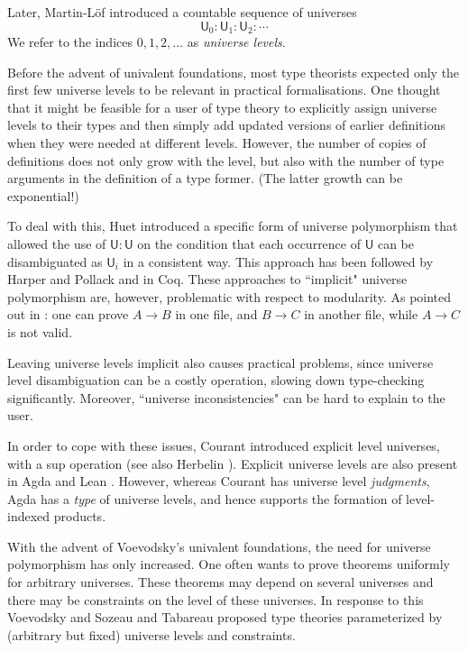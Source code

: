 \documentclass[11pt,a4paper]{article}
\theoremstyle{definition}
\newcommand{\UU}{\mathsf{U}}
\begin{document}
Later, Martin-L\"of \cite{martinlof:predicative} introduced a countable sequence of universes
$$
\UU_0 : \UU_1 : \UU_2 : \cdots
$$
We refer to the indices $0, 1, 2, \ldots$ as {\em universe levels}.

Before the advent of univalent foundations, most type theorists expected
only the first few universe levels to be relevant in practical formalisations.
One thought that it might be feasible for a user of
type theory to explicitly assign universe levels to their types and
then simply add updated versions of earlier
definitions when they were needed at different levels.
However, the number of copies of definitions does not only grow with the level,
but also with the number of type arguments in the definition of a type former.
(The latter growth can be exponential!)

To deal with this, Huet \cite{Huet87} introduced a specific form of
universe polymorphism that allowed the use of $\UU:\UU$
on the condition that each occurrence of $\UU$ can be disambiguated
as $\UU_i$ in a consistent way.
This approach has been followed by Harper and Pollack \cite{HarperP91} and
in Coq.
These  approaches to ``implicit" universe polymorphism are, however,
problematic with respect to modularity. As pointed out in \cite{Courant02,Simpson04}:
one can prove $A\rightarrow B$ in one file, and $B\rightarrow C$ in
another file, while $A\rightarrow C$ is not valid.

Leaving universe levels implicit also causes practical problems,
since universe level disambiguation can be a costly operation,
slowing down type-checking significantly.
Moreover, ``universe inconsistencies" can be hard to explain to the user.

In order to cope with these issues, Courant \cite{Courant02}
introduced explicit level universes,
with a sup operation (see also Herbelin \cite{herbelin05}).
Explicit universe levels are also present in Agda \cite{agda-manual} and
Lean \cite{moura:lean,Carneiro19}.
However, whereas Courant has
universe level \emph{judgments}, Agda has a \emph{type} of
universe levels, and hence supports the formation of level-indexed products.
%

With the advent of Voevodsky's univalent foundations,
the need for universe polymorphism has only increased.
One often wants to prove theorems uniformly for arbitrary universes. These theorems may depend on several universes and there may be constraints on the level of these universes.
In response to this Voevodsky  \cite{VV} and Sozeau and Tabareau \cite{SozeauTabareau:coq} proposed type theories parameterized by
(arbitrary but fixed) universe levels and constraints. 
\end{document}
